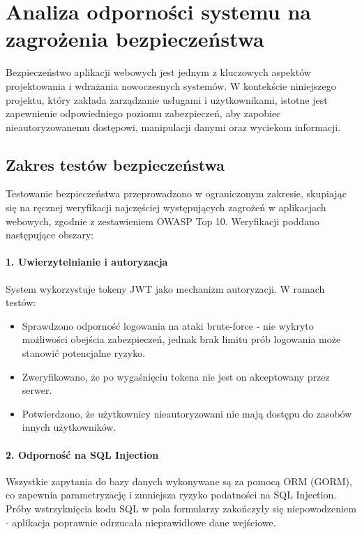 \section{Analiza odporności systemu na zagrożenia bezpieczeństwa}

Bezpieczeństwo aplikacji webowych jest jednym z kluczowych aspektów projektowania i wdrażania nowoczesnych systemów. W kontekście niniejszego projektu, który zakłada zarządzanie usługami i użytkownikami, istotne jest zapewnienie odpowiedniego poziomu zabezpieczeń, aby zapobiec nieautoryzowanemu dostępowi, manipulacji danymi oraz wyciekom informacji.

\subsection{Zakres testów bezpieczeństwa}

Testowanie bezpieczeństwa przeprowadzono w ograniczonym zakresie, skupiając się na ręcznej weryfikacji najczęściej występujących zagrożeń w aplikacjach webowych, zgodnie z zestawieniem OWASP Top 10. Weryfikacji poddano następujące obszary:

\paragraph{1. Uwierzytelnianie i autoryzacja}
System wykorzystuje tokeny JWT jako mechanizm autoryzacji. W ramach testów:
\begin{itemize}
    \item Sprawdzono odporność logowania na ataki brute-force - nie wykryto możliwości obejścia zabezpieczeń, jednak brak limitu prób logowania może stanowić potencjalne ryzyko.
    \item Zweryfikowano, że po wygaśnięciu tokena nie jest on akceptowany przez serwer.
    \item Potwierdzono, że użytkownicy nieautoryzowani nie mają dostępu do zasobów innych użytkowników.
\end{itemize}

\paragraph{2. Odporność na SQL Injection}
Wszystkie zapytania do bazy danych wykonywane są za pomocą ORM (GORM), co zapewnia parametryzację i zmniejsza ryzyko podatności na SQL Injection. Próby wstrzyknięcia kodu SQL w pola formularzy zakończyły się niepowodzeniem - aplikacja poprawnie odrzucała nieprawidłowe dane wejściowe.

